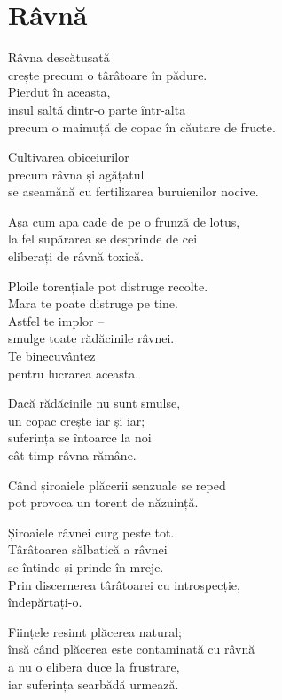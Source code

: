 
\chapter{Râvnă}


Râvna descătușată\\
crește precum o târâtoare în pădure.\\
Pierdut în aceasta,\\
insul saltă dintr-o parte într-alta\\
precum o maimuță de copac în căutare de fructe.


Cultivarea obiceiurilor\\
precum râvna și agățatul\\
se aseamănă cu fertilizarea buruienilor nocive.


Așa cum apa cade de pe o frunză de lotus,\\
la fel supărarea se desprinde de cei\\
eliberați de râvnă toxică.


Ploile torențiale pot distruge recolte.\\
Mara te poate distruge pe tine.\\
Astfel te implor –\\
smulge toate rădăcinile râvnei.\\
Te binecuvântez\\
pentru lucrarea aceasta.


Dacă rădăcinile nu sunt smulse,\\
un copac crește iar și iar;\\
suferința se întoarce la noi\\
cât timp râvna rămâne.


Când șiroaiele plăcerii senzuale se reped\\
pot provoca un torent de năzuință.


Șiroaiele râvnei curg peste tot.\\
Târâtoarea sălbatică a râvnei\\
se întinde și prinde în mreje.\\
Prin discernerea târâtoarei cu introspecție,\\
îndepărtați-o.


Ființele resimt plăcerea natural;\\
însă când plăcerea este contaminată cu râvnă\\
a nu o elibera duce la frustrare,\\
iar suferința searbădă urmează.


